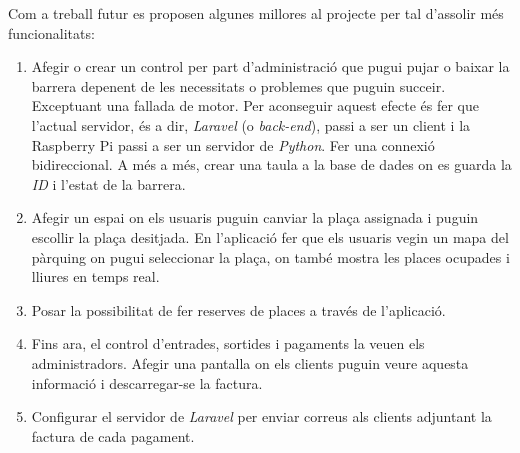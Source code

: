 
Com a treball futur es proposen algunes millores al projecte per tal d'assolir més funcionalitats:

\begin{enumerate}
    \item Afegir o crear un control per part d'administració que pugui pujar o baixar
    la barrera depenent de les necessitats o problemes que puguin succeir. Exceptuant una
    fallada de motor. Per aconseguir aquest efecte és fer que l'actual servidor,
    és a dir, \emph{Laravel} (o \emph{back-end}), passi a ser un client i la Raspberry Pi passi a ser
    un servidor de \emph{Python}. Fer una connexió bidireccional.
    A més a més, crear una taula a la base de dades on es guarda la \emph{ID} i l'estat de la barrera.
    \item Afegir un espai on els usuaris puguin canviar la plaça assignada i puguin
    escollir la plaça desitjada. En l'aplicació fer que els usuaris vegin un mapa
    del pàrquing on pugui seleccionar la plaça, on també mostra les places ocupades
    i lliures en temps real.
    \item Posar la possibilitat de fer reserves de places a través de l'aplicació.
    \item Fins ara, el control d'entrades, sortides i pagaments la veuen els administradors.
    Afegir una pantalla on els clients puguin veure aquesta informació i descarregar-se la factura.
    \item Configurar el servidor de \emph{Laravel} per enviar correus als clients adjuntant la factura
    de cada pagament.
\end{enumerate}
